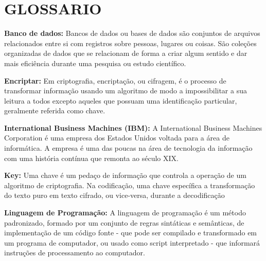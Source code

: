 
\newpage

\newpage

\newpage


\newpage
\chapter{\textbf{GLOSSARIO}}

\par \textbf{Banco de dados:} Bancos de dados ou bases de dados são conjuntos de arquivos relacionados entre si com registros sobre pessoas, lugares ou coisas. São coleções organizadas de dados que se relacionam de forma a criar algum sentido e dar mais eficiência durante uma pesquisa ou estudo científico.

\par \textbf{Encriptar:} Em criptografia, encriptação, ou cifragem, é o processo de transformar informação usando um algoritmo de modo a impossibilitar a sua leitura a todos excepto aqueles que possuam uma identificação particular, geralmente referida como chave.

\par \textbf{International Business Machines (IBM):} A International Business Machines Corporation é uma empresa dos Estados Unidos voltada para a área de informática. A empresa é uma das poucas na área de tecnologia da informação com uma história contínua que remonta ao século XIX.

\par \textbf{Key:} Uma chave é um pedaço de informação que controla a operação de um algoritmo de criptografia. Na codificação, uma chave específica a transformação do texto puro em texto cifrado, ou vice-versa, durante a decodificação

\par \textbf{Linguagem de Programação:} A linguagem de programação é um método padronizado, formado por um conjunto de regras sintáticas e semânticas, de implementação de um código fonte - que pode ser compilado e transformado em um programa de computador, ou usado como script interpretado - que informará instruções de processamento ao computador.

